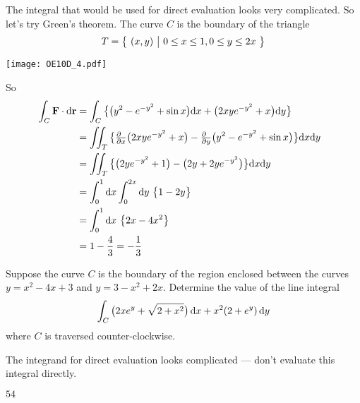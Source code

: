 \begin{solution} 
The integral that would be used for direct evaluation looks very
complicated. So let's try Green's theorem. The curve $C$ is the
boundary of the triangle
\begin{equation*}
T = \big\{ \ (x,y)\ \big|\ 0\le x\le 1, 0\le y\le 2x\ \big\}
\end{equation*}
\begin{center}
\texttt{[image: OE10D\_4.pdf]}
\end{center}
So
\begin{align*}
\int_C \vF\cdot\dee{\vr}
&= \int_C \big\{\big(y^2 - e^{-y^2} + \sin x\big)\dee{x}
               +\big(2xye^{-y^2} + x\big)\dee{y}\big\} \\
&= \dblInt_T \big\{
             \tfrac{\partial\hfill}{\partial x}\big(2xye^{-y^2} + x\big)
           -\tfrac{\partial\hfill}{\partial y}\big(y^2 - e^{-y^2} + \sin x\big)
               \big\}\dee{x}\dee{y} \hskip0.1in
\\
&= \dblInt_T \big\{
             \big(2ye^{-y^2} + 1\big)
           - \big(2y +2y e^{-y^2} \big)
               \big\}\dee{x}\dee{y} \\
&= \int_0^1\dee{x}\int_0^{2x}\dee{y}\  \big\{1-2y\big\} \\
&= \int_0^1\dee{x}\  \big\{2x-4x^2\big\} \\
&=1-\frac{4}{3} = -\frac{1}{3}
\end{align*}

\end{solution}

\begin{question}[M317 2009A] %
Suppose the curve $C$ is the boundary of the region enclosed between 
the curves $y = x^2 - 4x+3$ and $y = 3 - x^2 + 2x$. Determine the value 
of the line integral
\begin{equation*}
\int_C \big(2xe^y + \sqrt{2 + x^2}\big)\, \mathrm{d}x 
            + x^2 (2 + e^y)\, \mathrm{d}y
\end{equation*}
where $C$ is traversed counter-clockwise.
\end{question}

\begin{hint} 
The integrand for direct evaluation looks complicated ---
don't evaluate this integral directly.
\end{hint}

\begin{answer} 
$54$
\end{answer}

